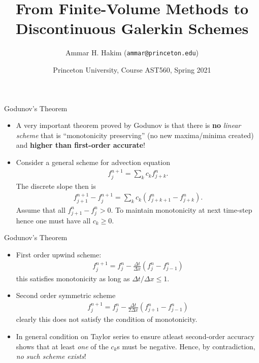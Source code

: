 \documentclass[aspectratio=169]{beamer}
\title[{\tt }]{From Finite-Volume Methods to Discontinuous Galerkin Schemes}%
\author[https://ast560.rtfd.io]%
{Ammar H. Hakim ({\tt ammar@princeton.edu}) \inst{1}}%
\institute[PPPL]
{ \inst{1} Princeton Plasma Physics Laboratory, Princeton, NJ %
}
\date[3/25/2021]{Princeton University, Course AST560, Spring 2021}
\newcommand{\mypause}{\pause}
\begin{document}
\begin{frame}[plain]
  \titlepage
\end{frame}



\begin{frame}{Godunov's Theorem}
  \small%
  \begin{itemize}
  \item A very important theorem proved by Godunov is that there is {
      \bf no} \emph{linear scheme} that is ``monotonicity preserving''
    (no new maxima/minima created) and {\bf higher than first-order
      accurate}!  \mypause%
  \item Consider a general scheme for advection equation
    \begin{align*}
      f_j^{n+1} = \sum_k c_k f_{j+k}^n.
    \end{align*}
    The discrete slope then is
    \begin{align*}
      f_{j+1}^{n+1} - f_j^{n+1} = \sum_k c_k \left( f_{j+k+1}^n - f_{j+k}^n \right).
    \end{align*}
    Assume that all $f_{j+1}^n - f_j^n > 0$. To maintain monotonicity
    at next time-step hence one must have all $c_k \ge 0$.
  \end{itemize}
\end{frame}

\begin{frame}{Godunov's Theorem}
  \small%
  \begin{itemize}
  \item First order upwind scheme:
    \begin{align*}
      f_j^{n+1} = f_j^n -\frac{\Delta t}{\Delta x}(f_j^n - f_{j-1}^n)
    \end{align*}
    this satisfies monotonicity as long as
    ${\Delta t}/{\Delta x} \le 1$.%
    \mypause%
  \item Second order symmetric scheme
    \begin{align*}
      f_j^{n+1} = f_j^n -\frac{\Delta t}{2 \Delta x}(f_{j+1}^n - f_{j-1}^n)
    \end{align*}
    clearly this does not satisfy the condition of monotonicity.
    \mypause%
  \item In general condition on Taylor series to ensure atleast
    second-order accuracy shows that at least \emph{one} of the $c_k$s
    must be negative. Hence, by contradiction, \emph{no such scheme
      exists}!
  \end{itemize}
\end{frame}
\end{document}
